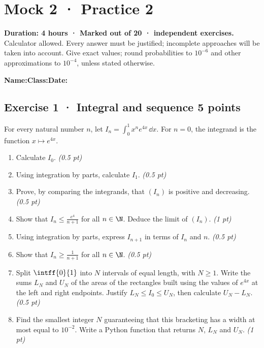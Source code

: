\fi

\mxnewpage{}\label{sujet:8-2}

\section*{Mock 2 · Practice 2}


\textbf{Duration: 4 hours · Marked out of 20 ·  independent exercises.}\\Calculator allowed. Every answer must be justified; incomplete approaches will be taken into account. Give exact values; round probabilities to $10^{-6}$ and other approximations to $10^{-4}$, unless stated otherwise.

\smallskip\textbf{Name:}\enspace\dotfill\quad\textbf{Class:}\enspace\dotfill\quad\textbf{Date:}\enspace\dotfill

\subsection*{Exercise 1 · Integral and sequence \hfill 5 points}For every natural number $n$, let $I_n=\displaystyle\int_0^1x^ne^{4x}\,\dd x$. For $n=0$, the integrand is the function $x\mapsto e^{4x}$.

\begin{enumerate}

\item Calculate $I_0$. \hfill\textit{(0.5 pt)}

\item Using integration by parts, calculate $I_1$. \hfill\textit{(0.5 pt)}

\item Prove, by comparing the integrands, that $(I_n)$ is positive and decreasing. \hfill\textit{(0.5 pt)}

\item Show that $I_n\le\frac{e^{4}}{n+1}$ for all $n\in\N$. Deduce the limit of $(I_n)$. \hfill\textit{(1 pt)}

\item Using integration by parts, express $I_{n+1}$ in terms of $I_n$ and $n$. \hfill\textit{(0.5 pt)}

\item Show that $I_n\ge\frac1{n+1}$ for all $n\in\N$. \hfill\textit{(0.5 pt)}

\item Split $\intff{0}{1}$ into $N$ intervals of equal length, with $N\ge1$. Write the sums $L_N$ and $U_N$ of the areas of the rectangles built using the values of $e^{4x}$ at the left and right endpoints. Justify $L_N\le I_0\le U_N$, then calculate $U_N-L_N$. \hfill\textit{(0.5 pt)}

\item Find the smallest integer $N$ guaranteeing that this bracketing has a width at most equal to $10^{-2}$. Write a Python function that returns $N$, $L_N$ and $U_N$. \hfill\textit{(1 pt)}

\end{enumerate}

